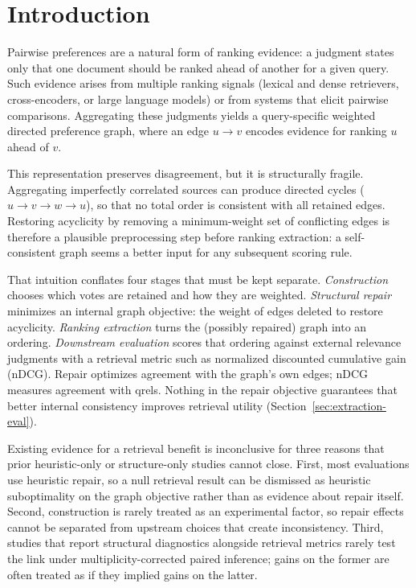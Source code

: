 \documentclass[pdflatex,sn-basic,Numbered]{sn-jnl}
\begin{document}
\maketitle

\section{Introduction}
\label{sec:introduction}

Pairwise preferences are a natural form of ranking evidence: a judgment
states only that one document should be ranked ahead of another for a given
query. Such evidence arises from multiple ranking signals (lexical and dense
retrievers, cross-encoders, or large language models) or from systems that
elicit pairwise comparisons. Aggregating these judgments yields a
query-specific weighted directed preference graph, where an edge
$u \rightarrow v$ encodes evidence for ranking $u$ ahead of $v$.

This representation preserves disagreement, but it is structurally fragile.
Aggregating imperfectly correlated sources can produce directed cycles
($u \rightarrow v \rightarrow w \rightarrow u$), so that no total order is
consistent with all retained edges. Restoring acyclicity by removing a
minimum-weight set of conflicting edges is therefore a plausible
preprocessing step before ranking extraction: a self-consistent graph seems
a better input for any subsequent scoring rule.

That intuition conflates four stages that must be kept separate.
\emph{Construction} chooses which votes are retained and how they are
weighted. \emph{Structural repair} minimizes an internal graph objective:
the weight of edges deleted to restore acyclicity. \emph{Ranking
extraction} turns the (possibly repaired) graph into an ordering.
\emph{Downstream evaluation} scores that ordering against external relevance
judgments with a retrieval metric such as normalized discounted cumulative
gain (nDCG). Repair optimizes agreement with the graph's own edges; nDCG
measures agreement with qrels. Nothing in the repair objective guarantees
that better internal consistency improves retrieval utility
(Section~\ref{sec:extraction-eval}).

Existing evidence for a retrieval benefit is inconclusive for three reasons
that prior heuristic-only or structure-only studies cannot close. First,
most evaluations use heuristic repair, so a null retrieval result can be
dismissed as heuristic suboptimality on the graph objective rather than as
evidence about repair itself.
Second, construction is rarely treated as an experimental factor, so repair
effects cannot be separated from upstream choices that create
inconsistency. Third, studies that report structural diagnostics alongside
retrieval metrics rarely test the link under multiplicity-corrected paired
inference; gains on the former are often treated as if they implied gains
on the latter.
\end{document}
